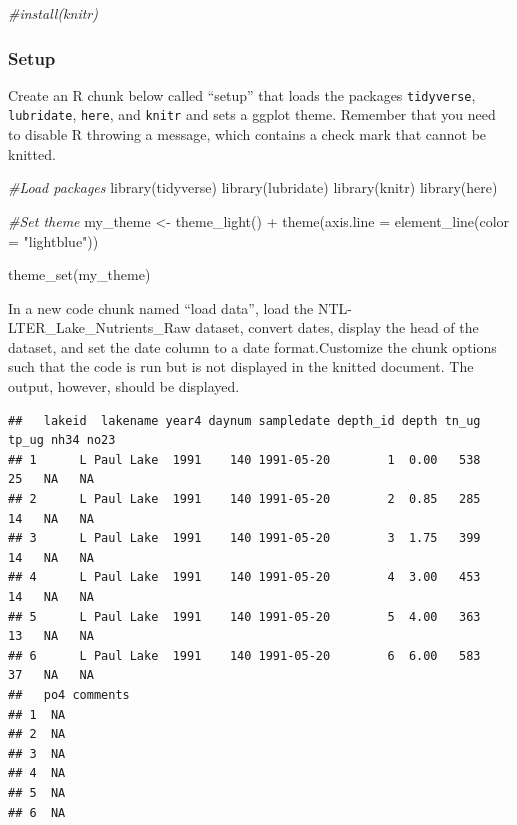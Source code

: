 \documentclass[
]{article}
\newenvironment{Shaded}{\begin{snugshade}}{\end{snugshade}}
\newcommand{\AttributeTok}[1]{\textcolor[rgb]{0.77,0.63,0.00}{#1}}
\newcommand{\CommentTok}[1]{\textcolor[rgb]{0.56,0.35,0.01}{\textit{#1}}}
\newcommand{\FunctionTok}[1]{\textcolor[rgb]{0.00,0.00,0.00}{#1}}
\newcommand{\NormalTok}[1]{#1}
\newcommand{\OtherTok}[1]{\textcolor[rgb]{0.56,0.35,0.01}{#1}}
\newcommand{\SpecialCharTok}[1]{\textcolor[rgb]{0.00,0.00,0.00}{#1}}
\newcommand{\StringTok}[1]{\textcolor[rgb]{0.31,0.60,0.02}{#1}}
\begin{document}
\begin{Shaded}
\begin{Highlighting}[]
\CommentTok{\#install(\textquotesingle{}knitr\textquotesingle{})}
\end{Highlighting}
\end{Shaded}

\hypertarget{setup}{%
\subsubsection{Setup}\label{setup}}

Create an R chunk below called ``setup'' that loads the packages
\texttt{tidyverse}, \texttt{lubridate}, \texttt{here}, and
\texttt{knitr} and sets a ggplot theme. Remember that you need to
disable R throwing a message, which contains a check mark that cannot be
knitted.

\begin{Shaded}
\begin{Highlighting}[]
\CommentTok{\#Load packages}
\FunctionTok{library}\NormalTok{(tidyverse)}
\FunctionTok{library}\NormalTok{(lubridate)}
\FunctionTok{library}\NormalTok{(knitr)}
\FunctionTok{library}\NormalTok{(here)}

\CommentTok{\#Set theme}
\NormalTok{my\_theme }\OtherTok{\textless{}{-}} \FunctionTok{theme\_light}\NormalTok{() }\SpecialCharTok{+} 
  \FunctionTok{theme}\NormalTok{(}\AttributeTok{axis.line =} \FunctionTok{element\_line}\NormalTok{(}\AttributeTok{color =} \StringTok{"lightblue"}\NormalTok{))}

\FunctionTok{theme\_set}\NormalTok{(my\_theme)}
\end{Highlighting}
\end{Shaded}

In a new code chunk named ``load data'', load the
NTL-LTER\_Lake\_Nutrients\_Raw dataset, convert dates, display the head
of the dataset, and set the date column to a date format.Customize the
chunk options such that the code is run but is not displayed in the
knitted document. The output, however, should be displayed.

\begin{verbatim}
##   lakeid  lakename year4 daynum sampledate depth_id depth tn_ug tp_ug nh34 no23
## 1      L Paul Lake  1991    140 1991-05-20        1  0.00   538    25   NA   NA
## 2      L Paul Lake  1991    140 1991-05-20        2  0.85   285    14   NA   NA
## 3      L Paul Lake  1991    140 1991-05-20        3  1.75   399    14   NA   NA
## 4      L Paul Lake  1991    140 1991-05-20        4  3.00   453    14   NA   NA
## 5      L Paul Lake  1991    140 1991-05-20        5  4.00   363    13   NA   NA
## 6      L Paul Lake  1991    140 1991-05-20        6  6.00   583    37   NA   NA
##   po4 comments
## 1  NA         
## 2  NA         
## 3  NA         
## 4  NA         
## 5  NA         
## 6  NA
\end{verbatim}
\end{document}
